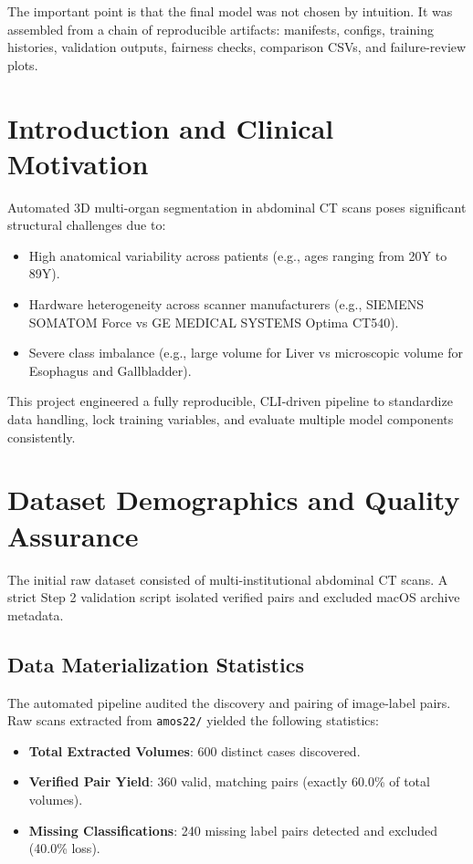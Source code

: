 \documentclass[11pt,a4paper]{article}
\begin{document}
The important point is that the final model was not chosen by intuition. It was assembled from a chain of reproducible artifacts: manifests, configs, training histories, validation outputs, fairness checks, comparison CSVs, and failure-review plots.

\tableofcontents
\newpage

\section{Introduction and Clinical Motivation}
Automated 3D multi-organ segmentation in abdominal CT scans poses significant structural challenges due to:
\begin{itemize}
    \item High anatomical variability across patients (e.g., ages ranging from 20Y to 89Y).
    \item Hardware heterogeneity across scanner manufacturers (e.g., SIEMENS SOMATOM Force vs GE MEDICAL SYSTEMS Optima CT540).
    \item Severe class imbalance (e.g., large volume for Liver vs microscopic volume for Esophagus and Gallbladder).
\end{itemize}

This project engineered a fully reproducible, CLI-driven pipeline to standardize data handling, lock training variables, and evaluate multiple model components consistently.

\section{Dataset Demographics and Quality Assurance}
The initial raw dataset consisted of multi-institutional abdominal CT scans. A strict Step 2 validation script isolated verified pairs and excluded macOS archive metadata.

\subsection{Data Materialization Statistics}
The automated pipeline audited the discovery and pairing of image-label pairs. Raw scans extracted from \texttt{amos22/} yielded the following statistics:
\begin{itemize}
    \item \textbf{Total Extracted Volumes}: 600 distinct cases discovered.
    \item \textbf{Verified Pair Yield}: 360 valid, matching pairs (exactly 60.0\% of total volumes).
    \item \textbf{Missing Classifications}: 240 missing label pairs detected and excluded (40.0\% loss).
\end{itemize}
\end{document}
